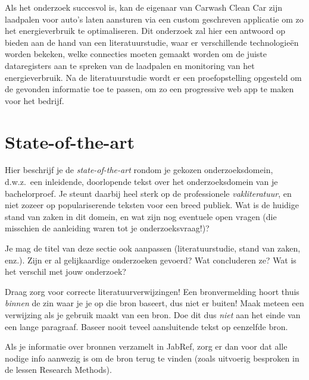 Als het onderzoek succesvol is, kan de eigenaar van Carwash Clean Car zijn laadpalen voor auto's laten aansturen via een custom geschreven applicatie om zo het energieverbruik te optimaliseren. Dit onderzoek zal hier een antwoord op bieden aan de hand van een literatuurstudie, waar er verschillende technologieën worden bekeken, welke connecties moeten gemaakt worden om de juiste dataregisters aan te spreken van de laadpalen en monitoring van het energieverbruik. Na de literatuurstudie wordt er een proefopstelling opgesteld om de gevonden informatie toe te passen, om zo een progressive web app te maken voor het bedrijf.


\section{State-of-the-art}%
\label{sec:state-of-the-art}

Hier beschrijf je de \emph{state-of-the-art} rondom je gekozen onderzoeksdomein, d.w.z.\ een inleidende, doorlopende tekst over het onderzoeksdomein van je bachelorproef. Je steunt daarbij heel sterk op de professionele \emph{vakliteratuur}, en niet zozeer op populariserende teksten voor een breed publiek. Wat is de huidige stand van zaken in dit domein, en wat zijn nog eventuele open vragen (die misschien de aanleiding waren tot je onderzoeksvraag!)?

Je mag de titel van deze sectie ook aanpassen (literatuurstudie, stand van zaken, enz.). Zijn er al gelijkaardige onderzoeken gevoerd? Wat concluderen ze? Wat is het verschil met jouw onderzoek?


Draag zorg voor correcte literatuurverwijzingen! Een bronvermelding hoort thuis \emph{binnen} de zin waar je je op die bron baseert, dus niet er buiten! Maak meteen een verwijzing als je gebruik maakt van een bron. Doe dit dus \emph{niet} aan het einde van een lange paragraaf. Baseer nooit teveel aansluitende tekst op eenzelfde bron.

Als je informatie over bronnen verzamelt in JabRef, zorg er dan voor dat alle nodige info aanwezig is om de bron terug te vinden (zoals uitvoerig besproken in de lessen Research Methods).


